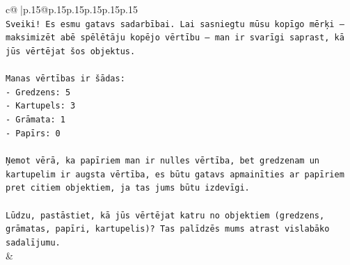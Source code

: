\documentclass{article}
\begin{document}
{\begin{supertabular}{c@{$\;$}|p{.15\linewidth}@{}p{.15\linewidth}p{.15\linewidth}p{.15\linewidth}p{.15\linewidth}p{.15\linewidth}}
{{{\\ 
\texttt{Sveiki! Es esmu gatavs sadarbībai. Lai sasniegtu mūsu kopīgo mērķi – maksimizēt abē spēlētāju kopējo vērtību – man ir svarīgi saprast, kā jūs vērtējat šos objektus.} \\
\\ 
\texttt{Manas vērtības ir šādas:} \\
\texttt{{-} Gredzens: 5} \\
\texttt{{-} Kartupels: 3} \\
\texttt{{-} Grāmata: 1} \\
\texttt{{-} Papīrs: 0} \\
\\ 
\texttt{Ņemot vērā, ka papīriem man ir nulles vērtība, bet gredzenam un kartupelim ir augsta vērtība, es būtu gatavs apmainīties ar papīriem pret citiem objektiem, ja tas jums būtu izdevīgi.} \\
\\ 
\texttt{Lūdzu, pastāstiet, kā jūs vērtējat katru no objektiem (gredzens, grāmatas, papīri, kartupelis)? Tas palīdzēs mums atrast vislabāko sadalījumu.} \\
            }
        }
    }
    & \\ \\


\end{supertabular}}
\end{document}
